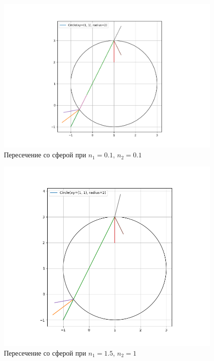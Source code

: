 {	\begin{figure}[H]
		\includegraphics[width=0.7\pagewidth]{sph_intersect1}
		\centering
		\caption{Пересечение со сферой при $n_1 = 0.1$, $n_2 = 0.1$}
		\label{sph_intersect1}
	\end{figure}
	
	\begin{figure}[H]
		\includegraphics[width=0.7\pagewidth]{sph_intersect2}
		\centering
		\caption{Пересечение со сферой при $n_1 = 1.5$, $n_2 = 1$}
		\label{sph_intersect2}
	\end{figure}
	
}

